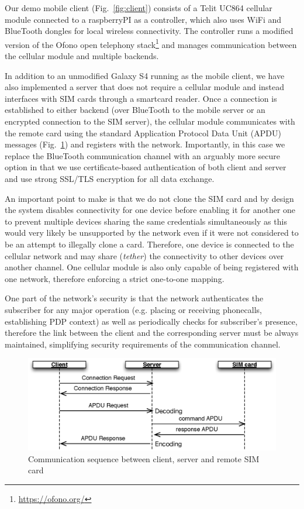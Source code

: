 \documentclass{sig-alternate-10pt}
\begin{document}
Our demo mobile client (Fig.~\ref{fig:client}) consists of a Telit UC864 cellular module connected to a raspberryPI as a controller, which also uses WiFi and BlueTooth dongles for local wireless connectivity. The controller runs a modified version of the Ofono open telephony stack\footnote{\url{https://ofono.org/}} and manages communication between the cellular module and multiple backends.

In addition to an unmodified Galaxy S4 running as the mobile client, we have also implemented a server that does not require a cellular module and instead interfaces with SIM cards through a smartcard reader. Once a connection is established to either backend (over BlueTooth to the mobile server or an encrypted connection to the SIM server), the cellular module communicates with the remote card using the standard Application Protocol Data Unit (APDU) messages (Fig.~\ref{fig:sequence}) and registers with the network. Importantly, in this case we replace the BlueTooth communication channel with an arguably more secure option in that we use certificate-based authentication of both client and server and use strong SSL/TLS encryption for all data exchange.

An important point to make is that we do not clone the SIM card and by design the system disables connectivity for one device before enabling it for another one to prevent multiple devices sharing the same credentials simultaneously as this would very likely be unsupported by the network even if it were not considered to be an attempt to illegally clone a card. Therefore, one device is connected to the cellular network and may share (\emph{tether}) the connectivity to other devices over another channel. One cellular module is also only capable of being registered with one network, therefore enforcing a strict one-to-one mapping.

One part of the network's security is that the network authenticates the subscriber for any major operation (e.g. placing or receiving phonecalls, establishing PDP context) as well as periodically checks for subscriber's presence, therefore the link between the client and the corresponding server must be always maintained, simplifying security requirements of the communication channel. 

\begin{figure}[t!]
\centering
\includegraphics[width=0.95\columnwidth]{figs/sequence}
\caption{Communication sequence between client, server and remote SIM card}
\label{fig:sequence}
\end{figure}
\end{document}
